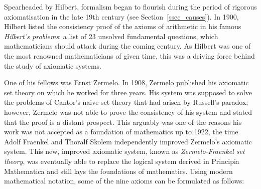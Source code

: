 \documentclass{article}
\begin{document}
Spearheaded by Hilbert, formalism began to flourish during the period of rigorous axiomatisation in the late 19th century (see Section~\ref{ssec_causes}). 
In 1900, Hilbert listed the consistency proof of the axioms of arithmetic in his famous \textit{Hilbert's problems}: a list of 23 unsolved fundamental questions, which mathematicians should attack during the coming century. As Hilbert was one of the most renowned mathematicians of given time, this was a driving force behind the study of axiomatic systems.

One of his fellows was Ernst Zermelo. In 1908, Zermelo published his axiomatic set theory on which he worked for three years. His system was supposed to solve the problems of Cantor's naive set theory that had arisen by Russell's paradox; however, Zermelo was not able to prove the consistency of his system and stated that the proof is a distant prospect. This arguably was one of the reasons his work was not accepted as a foundation of mathematics up to 1922, the time Adolf Fraenkel and Thoralf Skolem independently improved Zermelo's axiomatic system.
This new, improved axiomatic system, known as \textit{Zermelo-Fraenkel set theory}, was eventually able to replace the logical system derived in Principia Mathematica and still lays the foundations of mathematics. Using modern mathematical notation, some of the nine axioms can be formulated as follows:
\small
\end{document}
